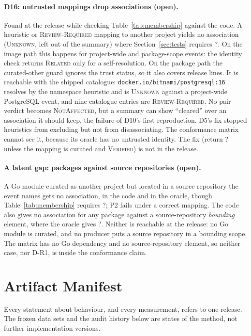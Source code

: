 \documentclass[11pt,a4paper]{article}
\newcommand{\code}[1]{\texttt{#1}}
\newcommand{\Ind}{\textsf{?}}
\begin{document}
\paragraph{D16: untrusted mappings drop associations (open).} Found at
the release while checking Table~\ref{tab:membership} against the
code. A heuristic or \textsc{Review-Required} mapping to another
project yields no association (\textsc{Unknown}, left out of the
summary) where Section~\ref{sec:tests} requires \Ind{}. On the image
path this happens for project-wide and package-scope events: the
identity check returns \textsc{Related} only for a self-resolution. On
the package path the curated-other guard ignores the trust status, so
it also covers release lines. It is reachable with the shipped
catalogue: \code{docker.io/bitnami/postgresql:16} resolves by the
namespace heuristic and is \textsc{Unknown} against a project-wide
PostgreSQL event, and nine catalogue entries are
\textsc{Review-Required}. No pair verdict becomes \textsc{NotAffected},
but a summary can show ``cleared'' over an association it should keep,
the failure of D10's first reproduction. D5's fix stopped heuristics
from excluding but not from disassociating. The conformance matrix
cannot see it, because its oracle has no untrusted identity. The fix
(return \Ind{} unless the mapping is curated and \textsc{Verified}) is
not in the release.

\paragraph{A latent gap: packages against source repositories
(open).} A Go module curated as another project but located in a
source repository the event names gets no association, in the code and
in the oracle, though Table~\ref{tab:membership} requires \Ind{}; P2
fails under a correct mapping. The code also gives no association for
any package against a source-repository \emph{bounding} element, where
the oracle gives \Ind{}. Neither is reachable at the release: no Go
module is curated, and no producer puts a source repository in a
bounding scope. The matrix has no Go dependency and no
source-repository element, so neither case, nor D-R1, is inside the
conformance claim.

\section{Artifact Manifest}
\label{app:repro}
\begingroup
\raggedright
Every statement about behaviour, and every measurement, refers to one
release. The frozen data sets and the audit history below are states
of the method, not further implementation versions.
\end{document}
